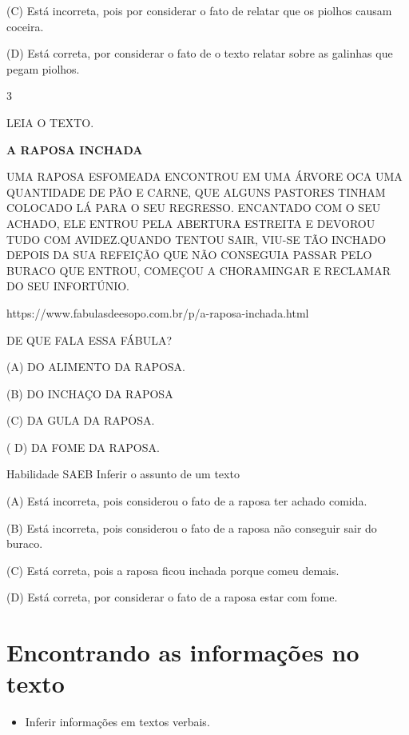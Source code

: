 {{{{{(C) Está incorreta, pois por considerar o fato de relatar que os piolhos
causam coceira.

(D) Está correta, por considerar o fato de o texto relatar sobre as
galinhas que pegam piolhos.

\num{3}

LEIA O TEXTO.

\textbf{A RAPOSA INCHADA}

UMA RAPOSA ESFOMEADA ENCONTROU EM UMA ÁRVORE OCA UMA QUANTIDADE DE PÃO E
CARNE, QUE ALGUNS PASTORES TINHAM COLOCADO LÁ PARA O SEU REGRESSO.
ENCANTADO COM O SEU ACHADO, ELE ENTROU PELA ABERTURA ESTREITA E DEVOROU
TUDO COM AVIDEZ.QUANDO TENTOU SAIR, VIU-SE TÃO INCHADO DEPOIS DA SUA
REFEIÇÃO QUE NÃO CONSEGUIA PASSAR PELO BURACO QUE ENTROU, COMEÇOU A
CHORAMINGAR E RECLAMAR DO SEU INFORTÚNIO.

https://www.fabulasdeesopo.com.br/p/a-raposa-inchada.html

DE QUE FALA ESSA FÁBULA?

(A) DO ALIMENTO DA RAPOSA.

(B) DO INCHAÇO DA RAPOSA

(C) DA GULA DA RAPOSA.

( D) DA FOME DA RAPOSA.

Habilidade SAEB Inferir o assunto de um texto

(A) Está incorreta, pois considerou o fato de a raposa ter achado
comida.

(B) Está incorreta, pois considerou o fato de a raposa não conseguir
sair do buraco.

(C) Está correta, pois a raposa ficou inchada porque comeu demais.

(D) Está correta, por considerar o fato de a raposa estar com fome.

\chapter{Encontrando as informações no texto}


\begin{itemize}
\item
Inferir informações em textos verbais.
\end{itemize}


}}}}}
